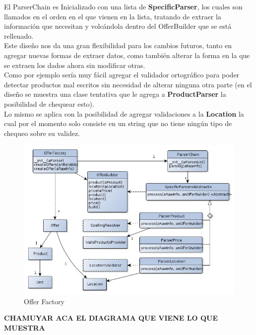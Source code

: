 \documentclass[10pt, a4paper]{article}
\begin{document}
El ParserChain es Inicializado con una lista de \textbf{SpecificParser}, los cuales son llamados en el orden en el que vienen en la lista, tratando de extraer la información que necesitan y volcándola dentro del OfferBuilder que se está rellenado.\\

Este diseño nos da una gran flexibilidad para los cambios futuros, tanto en agregar nuevas formas de extraer datos, como también alterar la forma en la que se extraen los dados ahora sin modificar otras.\\

Como por ejemplo sería muy fácil agregar el validador ortográfico para poder detectar productos mal escritos sin necesidad de alterar ninguna otra parte (en el diseño se muestra una clase tentativa que le agrega a \textbf{ProductParser} la posibilidad de chequear esto).\\

Lo mismo se aplica con la posibilidad de agregar validaciones a la \textbf{Location} la cual por el momento solo consiste en un string que no tiene ningún tipo de chequeo sobre su validez.\\ 



\begin{figure}[H]
\centering
\includegraphics[scale=0.65]{graphics/parser_class.jpg}
\caption{Offer Factory}
\end{figure}
 \textbf{CHAMUYAR ACA EL DIAGRAMA QUE VIENE LO QUE MUESTRA}
 
\end{document}
